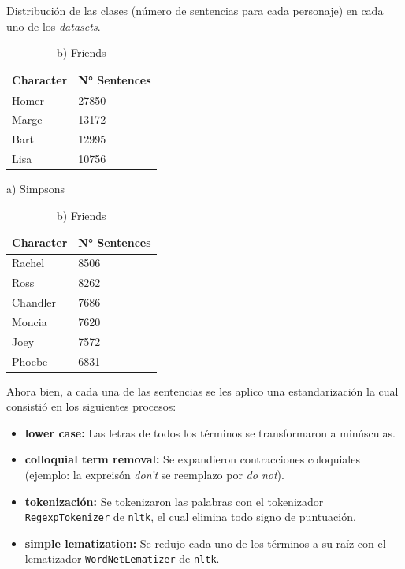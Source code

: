 \begin{table}[H]
\caption{Distribución de las clases (número de sentencias para cada personaje) en cada uno de los \textit{datasets}.}
\label{tab:dist-datos}
\centering
\begin{minipage}{0.45\textwidth}
\centering
\begin{tabular}{|l|l|}
\hline
\textbf{Character} & \textbf{N° Sentences} \\ \hline
Homer & 27850 \\ \hline
Marge & 13172 \\ \hline
Bart & 12995 \\ \hline
Lisa & 10756 \\ \hline
\end{tabular}
\caption*{a) Simpsons }

\end{minipage}\hfill
\begin{minipage}{0.45\textwidth}
\centering
\begin{tabular}{|l|l|}
\hline
\textbf{Character} & \textbf{N° Sentences} \\ \hline
Rachel & 8506 \\ \hline
Ross & 8262 \\ \hline
Chandler & 7686 \\ \hline
Moncia & 7620 \\ \hline
Joey & 7572 \\ \hline
Phoebe & 6831 \\ \hline
\end{tabular}
\caption*{b) Friends}

\end{minipage}

\end{table}

Ahora bien, a cada una de las sentencias se les aplico una estandarización la cual consistió en los siguientes procesos:

\begin{itemize}
    \item \textbf{lower case:} Las letras de todos los términos se transformaron a minúsculas.
    
    \item \textbf{colloquial term removal:} Se expandieron contracciones coloquiales (ejemplo: la expreisón \textit{don't} se reemplazo por \textit{do not}).
    
    \item \textbf{tokenización:} Se tokenizaron las palabras con el tokenizador \texttt{RegexpTokenizer} de \texttt{nltk}, el cual elimina todo signo de puntuación.
        
    \item \textbf{simple lematization:} Se redujo cada uno de los términos a su raíz con el lematizador \texttt{WordNetLematizer} de \texttt{nltk}.
    
\end{itemize}

